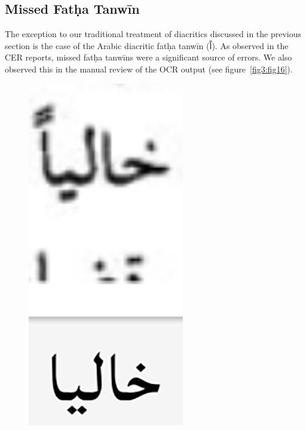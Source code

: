 \subsection{Missed Fatḥa Tanwīn}

The exception to our traditional treatment of diacritics discussed in the
previous section is the case of the Arabic diacritic fatḥa tanwīn (\textarabic{اً}). As
observed in the CER reports, missed fatḥa tanwīns were a significant source of
errors. We also observed this in the manual review of the OCR output (see
figure~\ref{fig3:fig16}).

\begin{figure}[!ht]
	\centering
	\includegraphics[width=\linewidth]{images/image3.png}

\end{figure}
